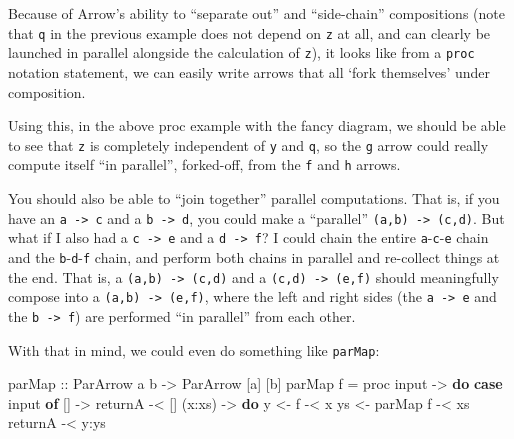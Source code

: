 \documentclass[]{article}
\newenvironment{Shaded}{}{}
\newcommand{\DataTypeTok}[1]{\textcolor[rgb]{0.56,0.13,0.00}{#1}}
\newcommand{\KeywordTok}[1]{\textcolor[rgb]{0.00,0.44,0.13}{\textbf{#1}}}
\newcommand{\NormalTok}[1]{#1}
\newcommand{\OperatorTok}[1]{\textcolor[rgb]{0.40,0.40,0.40}{#1}}
\newcommand{\OtherTok}[1]{\textcolor[rgb]{0.00,0.44,0.13}{#1}}
\begin{document}
Because of Arrow's ability to ``separate out'' and ``side-chain'' compositions
(note that \texttt{q} in the previous example does not depend on \texttt{z} at
all, and can clearly be launched in parallel alongside the calculation of
\texttt{z}), it looks like from a \texttt{proc} notation statement, we can
easily write arrows that all `fork themselves' under composition.

Using this, in the above proc example with the fancy diagram, we should be able
to see that \texttt{z} is completely independent of \texttt{y} and \texttt{q},
so the \texttt{g} arrow could really compute itself ``in parallel'', forked-off,
from the \texttt{f} and \texttt{h} arrows.

You should also be able to ``join together'' parallel computations. That is, if
you have an \texttt{a\ -\textgreater{}\ c} and a \texttt{b\ -\textgreater{}\ d},
you could make a ``parallel'' \texttt{(a,b)\ -\textgreater{}\ (c,d)}. But what
if I also had a \texttt{c\ -\textgreater{}\ e} and a
\texttt{d\ -\textgreater{}\ f}? I could chain the entire
\texttt{a}-\texttt{c}-\texttt{e} chain and the \texttt{b}-\texttt{d}-\texttt{f}
chain, and perform both chains in parallel and re-collect things at the end.
That is, a \texttt{(a,b)\ -\textgreater{}\ (c,d)} and a
\texttt{(c,d)\ -\textgreater{}\ (e,f)} should meaningfully compose into a
\texttt{(a,b)\ -\textgreater{}\ (e,f)}, where the left and right sides (the
\texttt{a\ -\textgreater{}\ e} and the \texttt{b\ -\textgreater{}\ f}) are
performed ``in parallel'' from each other.

With that in mind, we could even do something like \texttt{parMap}:

\begin{Shaded}
\begin{Highlighting}[]
\OtherTok{parMap ::} \DataTypeTok{ParArrow}\NormalTok{ a b }\OtherTok{{-}\textgreater{}} \DataTypeTok{ParArrow}\NormalTok{ [a] [b]}
\NormalTok{parMap f }\OtherTok{=}\NormalTok{ proc input }\OtherTok{{-}\textgreater{}} \KeywordTok{do}
    \KeywordTok{case}\NormalTok{ input }\KeywordTok{of}
\NormalTok{      []     }\OtherTok{{-}\textgreater{}}
\NormalTok{          returnA        }\OperatorTok{{-}\textless{}}\NormalTok{ []}
\NormalTok{      (x}\OperatorTok{:}\NormalTok{xs) }\OtherTok{{-}\textgreater{}} \KeywordTok{do}
\NormalTok{          y  }\OtherTok{\textless{}{-}}\NormalTok{ f        }\OperatorTok{{-}\textless{}}\NormalTok{ x}
\NormalTok{          ys }\OtherTok{\textless{}{-}}\NormalTok{ parMap f }\OperatorTok{{-}\textless{}}\NormalTok{ xs}
\NormalTok{          returnA        }\OperatorTok{{-}\textless{}}\NormalTok{ y}\OperatorTok{:}\NormalTok{ys}
\end{Highlighting}
\end{Shaded}
\end{document}
